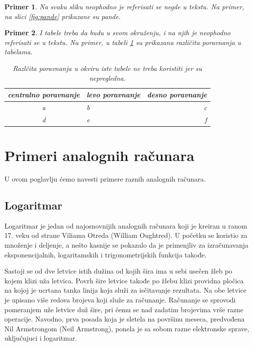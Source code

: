 \documentclass[a4paper]{article}
\newtheorem{primer}{Primer}[section]
\begin{document}
{\begin{primer}
Na svaku sliku neophodno je referisati se negde u tekstu. Na primer, na slici \ref{fig:pande} prikazane su pande. 
\end{primer}

\begin{primer} I tabele treba da budu u svom okruženju, i na njih je neophodno referisati se u tekstu. Na primer, u tabeli \ref{tab:tabela1} su prikazana različita poravnanja u tabelama.

\begin{table}[h!]
\begin{center}
\caption{Razlčita poravnanja u okviru iste tabele ne treba koristiti jer su nepregledna.}
\begin{tabular}{|c|l|r|} \hline
centralno poravnanje& levo poravnanje& desno poravnanje\\ \hline
a &b&c\\ \hline
d &e&f\\ \hline
\end{tabular}
\label{tab:tabela1}
\end{center}
\end{table}

\end{primer}





\section{Primeri analognih računara}
\label{sec:naslov1}


U ovom poglavlju ćemo navesti primere raznih analognih računara. 


\subsection{Logaritmar}
\label{subsec:podnaslov1}

Logaritmar je jedan od najosnovnijih analognih računara koji je kreiran u ranom 17. veku od strane Viliama Otreda (William Oughtred). U početku se koristio za množenje i deljenje, a nešto kasnije se pokazalo da je primenjliv za izračunavanja eksponencijalnih, logaritamskih i trigonometrijskih funkcija takođe.

Sastoji se od dve letvice istih dužina od kojih šira ima u sebi usečen žleb po kojem klizi uža letvica. Povrh šire letvice takođe po žlebu klizi providna pločica na kojoj je ucrtana tanka linija koja služi za isčitavanje rezultata. Na obe letvice je upisano više redova brojeva koji služe za računanje.
Računanje se sprovodi pomeranjem uže letvice duž šire, pri čemu se nad zadatim brojevima vrše razne operacije.
Navodno, prva posada koja je sletela na površinu meseca, predvođena Nil Armstrongom (Neil Armstrong), ponela je sa sobom razne elektronske sprave, uključujuci i logaritmar.

}
\end{document}
